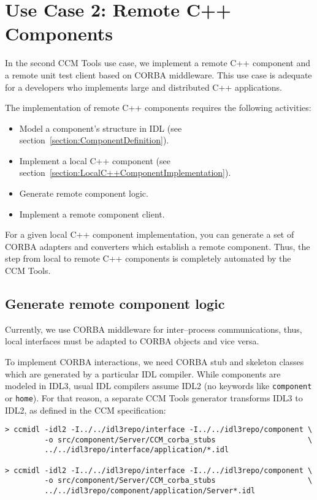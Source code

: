 \section{Use Case 2: Remote C++ Components}
\label{section:RemoteC++ComponentImplementation}

In the second CCM Tools use case, we implement a remote C++ component and a
remote unit test client based on CORBA middleware. 
This use case is adequate for a developers who implements large and distributed
C++ applications.

\vspace{3mm}
The implementation of remote C++ components requires the following activities:
\begin{itemize}
	\item Model a component's structure in IDL 
			(see section~\ref{section:ComponentDefinition}). 
	\item Implement a local C++ component (see section~\ref{section:LocalC++ComponentImplementation}).
	\item Generate remote component logic.
	\item Implement a remote component client.
\end{itemize}

For a given local C++ component implementation, you can generate a set of CORBA
adapters and converters which establish a remote component.
Thus, the step from local to remote C++ components is completely automated by
the CCM Tools.


\subsection{Generate remote component logic}
\label{subsection:GenerateRemoteComponentLogic}

Currently, we use CORBA middleware for inter--process communications, thus, local
interfaces must be adapted to CORBA objects and vice versa.

\vspace{3mm}
To implement CORBA interactions, we need CORBA stub and skeleton classes which
are generated by a particular IDL compiler. While components are modeled in
IDL3, usual IDL compilers assume IDL2 (no keywords like {\tt component} or 
{\tt home}).
For that reason, a separate CCM Tools generator transforms IDL3 to IDL2, as defined in
the CCM specification:
\begin{verbatim}
> ccmidl -idl2 -I../../idl3repo/interface -I../../idl3repo/component \
         -o src/component/Server/CCM_corba_stubs                     \  
         ../../idl3repo/interface/application/*.idl

> ccmidl -idl2 -I../../idl3repo/interface -I../../idl3repo/component \
         -o src/component/Server/CCM_corba_stubs                     \
         ../../idl3repo/component/application/Server*.idl
\end{verbatim}

